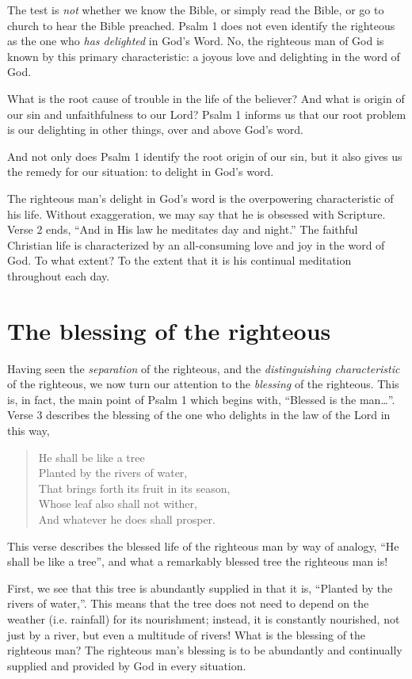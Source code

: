 \documentclass[a5paper]{book}
\newcommand{\Q}[1]{\begin{quote}#1\end{quote}}
\begin{document}
The test is \emph{not} whether we know the Bible,
    or simply read the Bible,
    or go to church to hear the Bible preached.
Psalm 1 does not even identify the righteous as the one
    who \emph{has delighted} in God's Word.
No, the righteous man of God is known by this primary characteristic:
    a joyous love and delighting in the word of God.

What is the root cause of trouble in the life of the believer?
And what is origin of our sin and unfaithfulness to our Lord?
Psalm 1 informs us that our root problem is our delighting in other things,
    over and above God's word.

And not only does Psalm 1 identify the root origin of our sin,
    but it also gives us the remedy for our situation:
    to delight in God's word.

The righteous man's delight in God's word is the overpowering characteristic
    of his life.
Without exaggeration, we may say that he is obsessed with Scripture.
Verse 2 ends, ``And in His law he meditates day and night.''
The faithful Christian life is characterized by
    an all-consuming love and joy in the word of God.
To what extent?
To the extent that it is his continual meditation throughout each day.
    
\section{The blessing of the righteous}
Having seen the \emph{separation} of the righteous,
    and the \emph{distinguishing characteristic} of the righteous,
    we now turn our attention to the \emph{blessing} of the righteous.
This is, in fact, the main point of Psalm 1 which begins with, 
    ``Blessed is the man\ldots''.
Verse 3 describes the blessing of the one who delights in the law of the Lord 
    in this way,
    \Q{He shall be like a tree \\
    Planted by the rivers of water, \\
    That brings forth its fruit in its season, \\
    Whose leaf also shall not wither, \\
    And whatever he does shall prosper.}

This verse describes the blessed life of the righteous man by way of analogy,
    ``He shall be like a tree'',
    and what a remarkably blessed tree the righteous man is!

First, we see that this tree is abundantly supplied
    in that it is, ``Planted by the rivers of water,''.
This means that the tree does not need to depend on the weather (i.e. rainfall)
    for its nourishment;
    instead, it is constantly nourished,
    not just by a river,
    but even a multitude of rivers!
What is the blessing of the righteous man?
The righteous man's blessing is to be abundantly and continually supplied 
    and provided by God in every situation.
\end{document}
